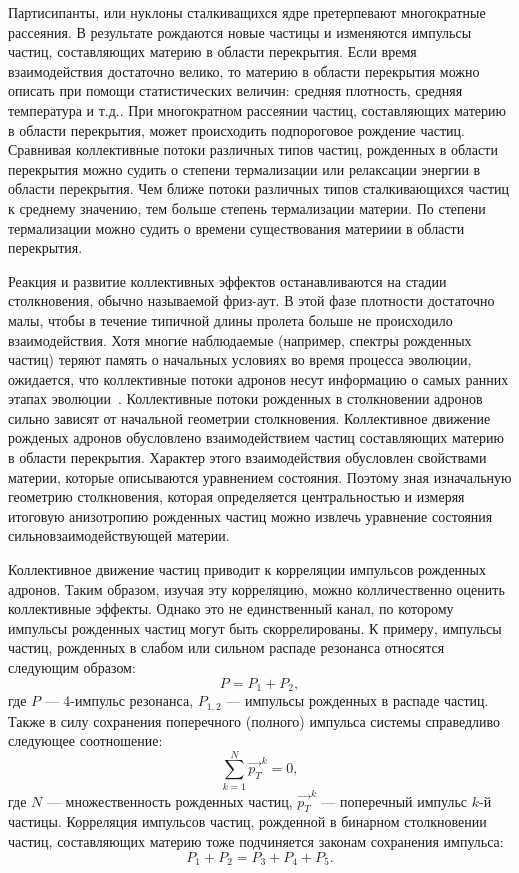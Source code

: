 Партисипанты, или нуклоны сталкиващихся ядре претерпевают многократные рассеяния.
В результате рождаются новые частицы и изменяются импульсы частиц, составляющих материю в области перекрытия.
Если время взаимодействия достаточно велико, то материю в области перекрытия можно описать при помощи статистических величин: средняя плотность, средняя температура и т.д..
При многократном рассеянии частиц, составляющих материю в области перекрытия, может происходить подпороговое рождение частиц.
Сравнивая коллективные потоки различных типов частиц, рожденных в области перекрытия можно судить о степени термализации или релаксации энергии в области перекрытия.
Чем ближе потоки различных типов сталкивающихся частиц к среднему значению, тем больше степень термализации материи.
По степени термализации можно судить о времени существования материии в области перекрытия.  

Реакция и развитие коллективных эффектов останавливаются на стадии столкновения, обычно называемой фриз-аут. 
В этой фазе плотности достаточно малы, чтобы в течение типичной длины пролета больше не происходило взаимодействия.
Хотя многие наблюдаемые (например, спектры рожденных частиц) теряют память о начальных условиях во время процесса эволюции, ожидается, что коллективные потоки адронов несут информацию о самых ранних этапах эволюции~\cite{Herrmann:1999wu}.
Коллективные потоки рожденных в столкновении адронов сильно зависят от начальной геометрии столкновения.
Коллективное движение рожденых адронов обусловлено взаимодействием частиц составляющих материю в области перекрытия.
Характер этого взаимодействия обусловлен свойствами материи, которые описываются уравнением состояния.
Поэтому зная изначальную геометрию столкновения, которая определяется центральностью и измеряя итоговую анизотропию рожденных частиц можно извлечь уравнение состояния сильновзаимодействующей материи.

Коллективное движение частиц приводит к корреляции импульсов рожденных адронов.
Таким образом, изучая эту корреляцию, можно колличественно оценить коллективные эффекты.
Однако это не единственный канал, по которому импульсы рожденных частиц могут быть скоррелированы.
К примеру, импульсы частиц, рожденных в слабом или сильном распаде резонанса относятся следующим образом:
%
\begin{equation}
    P = P_1 + P_2,
\end{equation}
где $P$ --- 4-импульс резонанса, $P_{1,2}$ --- импульсы рожденных в распаде частиц.
Также в силу сохранения поперечного (полного) импульса системы справедливо следующее соотношение:
%
\begin{equation}
    \sum_{k=1}^{N} \vec{p_T}^k = 0,
\end{equation}
где $N$ --- множественность рожденных частиц, $\vec{p_{T}}^k$ --- поперечный импульс $k$-й частицы.
Корреляция импульсов частиц, рожденной в бинарном столкновении частиц, составляющих материю тоже подчиняется законам сохранения импульса:
%
\begin{equation}
    P_1 + P_2 = P_3 + P_4 + P_5.
\end{equation}

